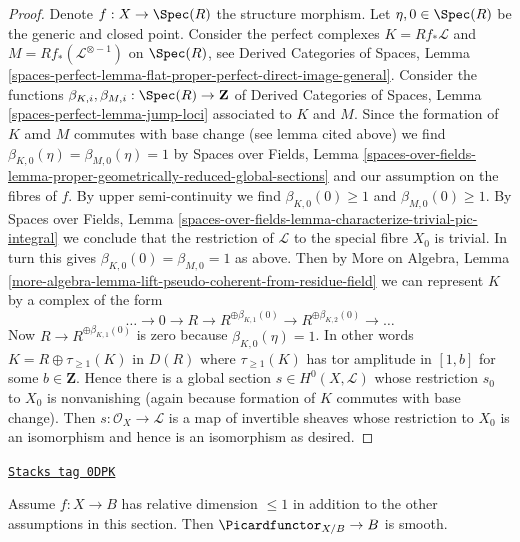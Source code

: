 \begin{proof}
\medskip\noindent
Denote $f : X \to \Spec(R)$ the structure morphism.
Let $\eta, 0 \in \Spec(R)$ be the generic and closed point.
Consider the perfect complexes
$K = Rf_*\mathcal{L}$ and $M = Rf_*(\mathcal{L}^{\otimes -1})$
on $\Spec(R)$, see Derived Categories of Spaces, Lemma
\ref{spaces-perfect-lemma-flat-proper-perfect-direct-image-general}.
Consider the functions
$\beta_{K, i}, \beta_{M, i} : \Spec(R) \to \mathbf{Z}$
of Derived Categories of Spaces, Lemma
\ref{spaces-perfect-lemma-jump-loci} associated to $K$ and $M$.
Since the formation of $K$ amd $M$ commutes with
base change (see lemma cited above) we find
$\beta_{K, 0}(\eta) = \beta_{M, 0}(\eta) = 1$ by
Spaces over Fields, Lemma
\ref{spaces-over-fields-lemma-proper-geometrically-reduced-global-sections}
and our assumption on the fibres of $f$.
By upper semi-continuity we find
$\beta_{K, 0}(0) \geq 1$ and $\beta_{M, 0}(0) \geq 1$.
By
Spaces over Fields, Lemma
\ref{spaces-over-fields-lemma-characterize-trivial-pic-integral}
we conclude that the restriction of $\mathcal{L}$
to the special fibre $X_0$ is trivial. In turn this gives
$\beta_{K, 0}(0) = \beta_{M, 0} = 1$ as above.
Then by More on Algebra, Lemma
\ref{more-algebra-lemma-lift-pseudo-coherent-from-residue-field}
we can represent $K$ by a complex of the form
$$
\ldots \to 0 \to R \to R^{\oplus \beta_{K, 1}(0)} \to
R^{\oplus \beta_{K, 2}(0)} \to \ldots
$$
Now $R \to R^{\oplus \beta_{K, 1}(0)}$ is zero
because $\beta_{K, 0}(\eta) = 1$. In other words
$K = R \oplus \tau_{\geq 1}(K)$ in $D(R)$ where $\tau_{\geq 1}(K)$
has tor amplitude in $[1, b]$ for some $b \in \mathbf{Z}$.
Hence there is a global section $s \in H^0(X, \mathcal{L})$
whose restriction $s_0$
to $X_0$ is nonvanishing (again because formation of $K$
commutes with base change). Then $s : \mathcal{O}_X \to \mathcal{L}$
is a map of invertible sheaves whose restriction to $X_0$
is an isomorphism and hence is an isomorphism as desired.
\end{proof}

\begin{lemma}
\label{moduli-lemma-pic-functor-curves-smooth}
\href{https://stacks.math.columbia.edu/tag/0DPK}{\texttt{Stacks tag 0DPK}}

Assume $f : X \to B$ has relative dimension $\leq 1$ in addition to
the other assumptions in this section. Then $\Picardfunctor_{X/B} \to B$
is smooth.
\end{lemma}

